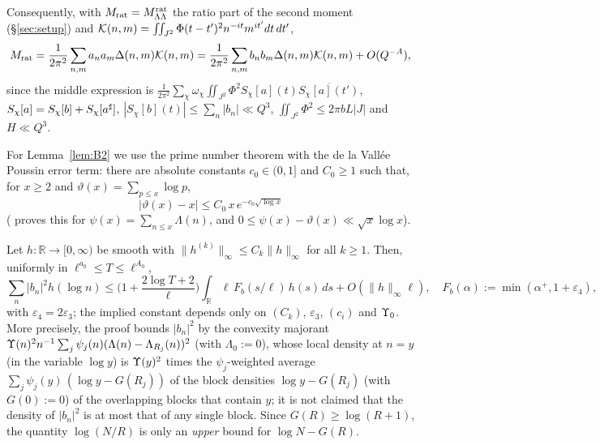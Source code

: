 Consequently, with $M_{\rm rat}=M^{\mathrm{rat}}_{\Lambda\Lambda}$ the ratio part of the second moment (\S\ref{sec:setup}) and
$\mathcal{K}(n,m)=\iint_{J^2}\Phi(t-t')^2n^{-it}m^{it'}dt\,dt'$,
\begin{equation}\label{eqB:Mrat}
 M_{\rm rat}=\frac1{2\pi^2}\sum_{n,m}a_na_m\Delta(n,m)\mathcal{K}(n,m)=\frac1{2\pi^2}\sum_{n,m}b_nb_m\Delta(n,m)\mathcal{K}(n,m)+O(Q^{-A}),
\end{equation}
since the middle expression is $\frac1{2\pi^2}\sum_\chi\omega_\chi\iint_{J^2}\Phi^2S_\chi[a](t)\overline{S_\chi[a](t')}$,
$S_\chi[a]=S_\chi[b]+S_\chi[a^\sharp]$, $|S_\chi[b](t)|\le\sum_n|b_n|\ll Q^{3}$, $\iint_{J^2}\Phi^2\le2\pi bL|J|$ and $H\ll Q^3$.

For Lemma~\ref{lem:B2} we use the prime number theorem with the de la Vall\'ee Poussin error term: there are absolute constants
$c_0\in(0,1]$ and $C_0\ge1$ such that, for $x\ge2$ and $\vartheta(x)=\sum_{p\le x}\log p$,
\begin{equation}\label{eqB:PNT}
 |\vartheta(x)-x|\le C_0\,x\,e^{-c_0\sqrt{\log x}}
\end{equation}
(\cite[Ch.~18]{Dav} proves this for $\psi(x)=\sum_{n\le x}\Lambda(n)$, and $0\le\psi(x)-\vartheta(x)\ll\sqrt x\log x$).

\begin{lemma}\label{lem:B2}
Let $h:\mathbb R\to[0,\infty)$ be smooth with $\|h^{(k)}\|_\infty\le C_k\|h\|_\infty$ for all $k\ge1$. Then, uniformly in $\ell^{a_0}\le T\le\ell^{A_0}$,
\[
 \sum_n|b_n|^2h(\log n)\le\Big(1+\frac{2\log T+2}{\ell}\Big)\int_{\mathbb R}\ell\,F_b(s/\ell)\,h(s)\,ds+O(\|h\|_\infty\ell),\quad F_b(\alpha):=\min(\alpha^+,1+\varepsilon_4),
\]
with $\varepsilon_4=2\varepsilon_3$; the implied constant depends only on $(C_k)$, $\varepsilon_3$, $(c_i)$ and $\Upsilon_0$. More precisely, the
proof bounds $|b_n|^2$ by the convexity majorant $\Upsilon(n)^2n^{-1}\sum_j\psi_j(n)(\Lambda(n)-\Lambda_{R_j}(n))^2$ (with $\Lambda_0:=0$), whose
local density at $n=y$ (in the variable $\log y$) is $\Upsilon(y)^2$ times the $\psi_j$-weighted average $\sum_j\psi_j(y)\,(\log y-G(R_j))$ of the block
densities $\log y-G(R_j)$ (with $G(0):=0$) of the overlapping blocks that contain $y$; it is not claimed that the density of $|b_n|^2$ is
at most that of any single block. Since $G(R)\ge\log(R+1)$, the quantity $\log(N/R)$ is only an \emph{upper} bound for $\log N-G(R)$.
\end{lemma}

